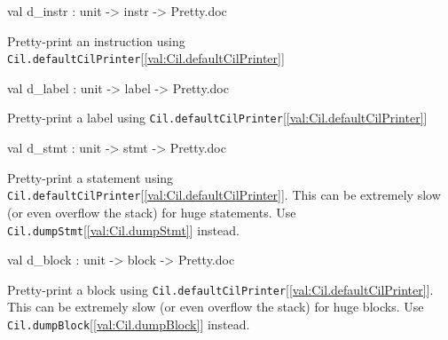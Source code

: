 \documentclass[11pt]{article}
\begin{document}
\label{val:Cil.d-underscoreinstr}\begin{ocamldoccode}
val d_instr : unit -> instr -> Pretty.doc
\end{ocamldoccode}
\begin{ocamldocdescription}
Pretty-print an instruction using {\tt{Cil.defaultCilPrinter}}[\ref{val:Cil.defaultCilPrinter}]


\end{ocamldocdescription}




\label{val:Cil.d-underscorelabel}\begin{ocamldoccode}
val d_label : unit -> label -> Pretty.doc
\end{ocamldoccode}
\begin{ocamldocdescription}
Pretty-print a label using {\tt{Cil.defaultCilPrinter}}[\ref{val:Cil.defaultCilPrinter}]


\end{ocamldocdescription}




\label{val:Cil.d-underscorestmt}\begin{ocamldoccode}
val d_stmt : unit -> stmt -> Pretty.doc
\end{ocamldoccode}
\begin{ocamldocdescription}
Pretty-print a statement using {\tt{Cil.defaultCilPrinter}}[\ref{val:Cil.defaultCilPrinter}]. This can be 
 extremely slow (or even overflow the stack) for huge statements. Use 
 {\tt{Cil.dumpStmt}}[\ref{val:Cil.dumpStmt}] instead.


\end{ocamldocdescription}




\label{val:Cil.d-underscoreblock}\begin{ocamldoccode}
val d_block : unit -> block -> Pretty.doc
\end{ocamldoccode}
\begin{ocamldocdescription}
Pretty-print a block using {\tt{Cil.defaultCilPrinter}}[\ref{val:Cil.defaultCilPrinter}]. This can be 
 extremely slow (or even overflow the stack) for huge blocks. Use 
 {\tt{Cil.dumpBlock}}[\ref{val:Cil.dumpBlock}] instead.


\end{ocamldocdescription}
\end{document}
